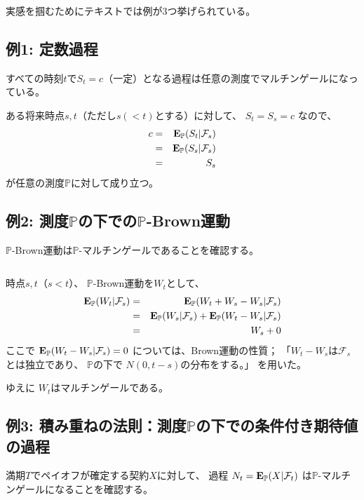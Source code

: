\documentclass[uplatex,a4j,12pt,dvipdfmx]{jsarticle}
\begin{document}
実感を掴むためにテキストでは例が3つ挙げられている。
\subsection{例1: 定数過程}

すべての時刻$t$で$S_{t}=c$（一定）となる過程は任意の測度でマルチンゲールになっている。

ある将来時点$s,t$（ただし$s(<t)$とする）に対して、
$S_{t}=S_{s}=c$
なので、
%
\begin{eqnarray*}
	c
	&=&
	{\bf E}_{\mathbb{P}}( S_{t} | \mathcal{F}_{s} )
	\\ &=&
	{\bf E}_{\mathbb{P}}( S_{s} | \mathcal{F}_{s} )
	\\ &=&
	S_{s}
\end{eqnarray*}
%
が任意の測度$\mathbb{P}$に対して成り立つ。
\subsection{例2: 測度$\mathbb{P}$の下での$\mathbb{P}$-Brown運動}

$\mathbb{P}$-Brown運動は$\mathbb{P}$-マルチンゲールであることを確認する。

${}$

時点$s,t$（$s<t$）、
$\mathbb{P}$-Brown運動を$W_{t}$として、
%
\begin{eqnarray*}
	{\bf E}_{\mathbb{P}}( W_{t} | \mathcal{F}_{s} )
	&=&
	{\bf E}_{\mathbb{P}}( W_{t} + W_{s} - W_{s} | \mathcal{F}_{s} )
	\\ &=&
	{\bf E}_{\mathbb{P}}( W_{s} | \mathcal{F}_{s} )
	+
	{\bf E}_{\mathbb{P}}( W_{t} - W_{s} | \mathcal{F}_{s} )
	\\ &=&
	W_{s}
	+
	0
\end{eqnarray*}
%
ここで
$
	{\bf E}_{\mathbb{P}}( W_{t} - W_{s} | \mathcal{F}_{s} )
	=0
$
については、Brown運動の性質；
「$W_{t} - W_{s}$は$\mathcal{F}_{s}$とは独立であり、
$\mathbb{P}$の下で
$N(0,t-s)$の分布をする。」
を用いた。

ゆえに
$W_{t}$はマルチンゲールである。

\subsection{例3: 積み重ねの法則：測度$\mathbb{P}$の下での条件付き期待値の過程}

満期$T$でペイオフが確定する契約$X$に対して、
過程
$
	N_{t} = {\bf E}_{\mathbb{P}}( X | \mathcal{F}_{t} )
$
は$\mathbb{P}$-マルチンゲールになることを確認する。
\end{document}
